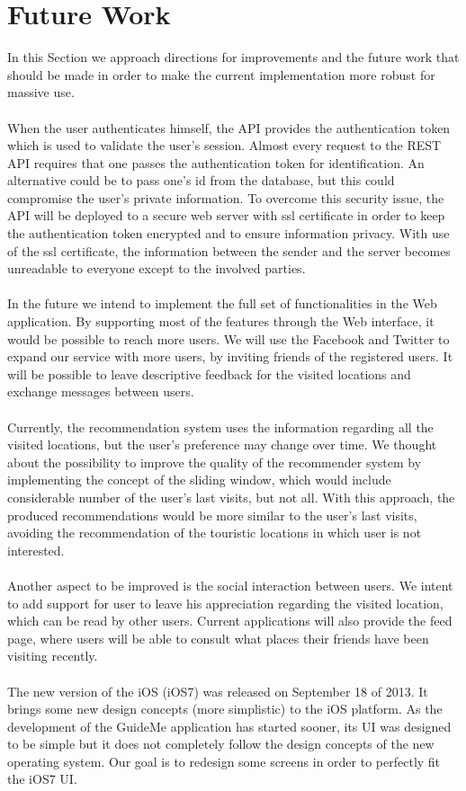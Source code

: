 \section{Future Work}
\label{lbl:featureWork}
In this Section we approach directions for improvements and the future work that should be made in order to make the current implementation more robust for massive use.\\
\\
When the user authenticates himself, the API provides the authentication token which is used to validate the user's session. Almost every request to the REST API requires that one passes the authentication token for identification. An alternative could be to pass one's id from the database, but this could compromise the user's private information. To overcome this security issue, the API will be deployed to a secure web server with \gls{ssl} certificate in order to keep the authentication token encrypted and to ensure information privacy. With use of the \gls{ssl} certificate, the information between the sender and the server becomes unreadable to everyone except to the involved parties.\\
\\
In the future we intend to implement the full set of functionalities in the Web application. By supporting most of the features through the Web interface, it would be possible to reach more users. We will use the Facebook and Twitter to expand our service with more users, by inviting friends of the registered users. It will be possible to leave descriptive feedback for the visited locations and exchange messages between users.\\
\\
Currently, the recommendation system uses the information regarding all the visited locations, but the user's preference may change over time. We thought about the possibility to improve the quality of the recommender system by implementing the concept of the sliding window, which would include considerable number of the user's last visits, but not all. With this approach, the produced recommendations would be more similar to the user's last visits, avoiding the recommendation of the touristic locations in which user is not interested.\\
\\
Another aspect to be improved is the social interaction between users. We intent to add support for user to leave his appreciation regarding the visited location, which can be read by other users. Current applications will also provide the feed page, where users will be able to consult what places their friends have been visiting recently.\\
\\
The new version of the iOS (iOS7) was released on September 18 of 2013. It brings some new design concepts (more simplistic) to the iOS platform. As the development of the GuideMe application has started sooner, its UI was designed to be simple but it does not completely follow the design concepts of the new operating system. Our goal is to redesign some screens in order to perfectly fit the iOS7 UI.